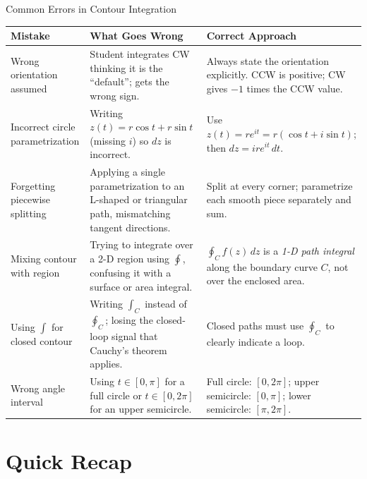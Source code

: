 \documentclass[12pt,a4paper]{article}
\begin{document}
\begin{mistakebox}{Common Errors in Contour Integration}
\renewcommand{\arraystretch}{1.35}
\begin{tabular}{@{}p{3.5cm}p{5cm}p{5cm}@{}}
\toprule
\textbf{Mistake} & \textbf{What Goes Wrong} & \textbf{Correct Approach} \\
\midrule
Wrong orientation assumed
& Student integrates CW thinking it is the ``default''; gets the wrong sign.
& Always state the orientation explicitly. CCW is positive; CW gives $-1$ times the CCW value. \\
Incorrect circle parametrization
& Writing $z(t)=r\cos t + r\sin t$ (missing $i$) so $dz$ is incorrect.
& Use $z(t)=re^{it}=r(\cos t + i\sin t)$; then $dz=ire^{it}\,dt$. \\
Forgetting piecewise splitting
& Applying a single parametrization to an L-shaped or triangular path, mismatching tangent directions.
& Split at every corner; parametrize each smooth piece separately and sum. \\
Mixing contour with region
& Trying to integrate over a 2-D region using $\oint$, confusing it with a surface or area integral.
& $\oint_C f(z)\,dz$ is a \emph{1-D path integral} along the boundary curve $C$, not over the enclosed area. \\
Using $\int$ for closed contour
& Writing $\int_C$ instead of $\oint_C$; losing the closed-loop signal that Cauchy's theorem applies.
& Closed paths must use $\oint_C$ to clearly indicate a loop. \\
Wrong angle interval
& Using $t\in[0,\pi]$ for a full circle or $t\in[0,2\pi]$ for an upper semicircle.
& Full circle: $[0,2\pi]$; upper semicircle: $[0,\pi]$; lower semicircle: $[\pi,2\pi]$. \\
\bottomrule
\end{tabular}
\end{mistakebox}

\section{Quick Recap}
\end{document}
